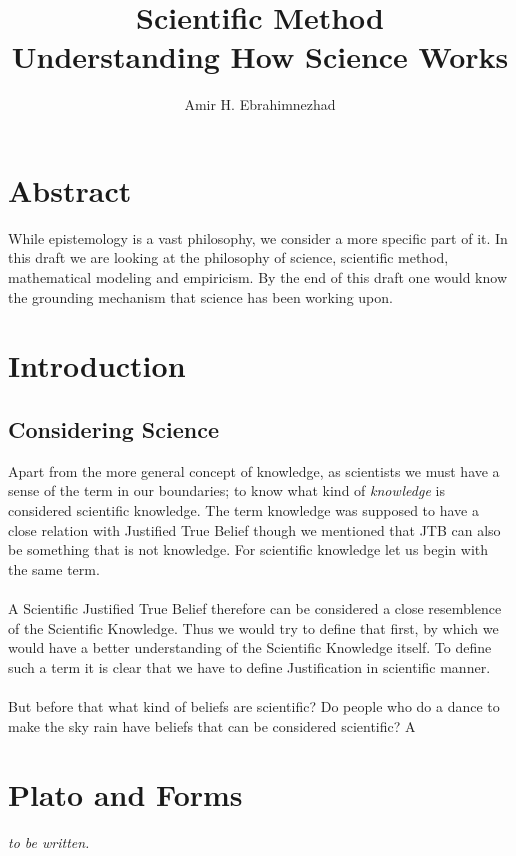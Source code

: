 \documentclass[9pt,a4paper,twocolumn]{article}
\title{Scientific Method \\ \large Understanding How Science Works}
\author{Amir H. Ebrahimnezhad}
\date{}
\newcounter{def}
\begin{document}
        \maketitle
        \tableofcontents
        \section*{Abstract}
            While epistemology is a vast philosophy, we consider a more specific part of it. In this draft we are looking at the philosophy of science, scientific method, mathematical modeling and empiricism. By the end of this draft one would know the grounding mechanism that science has been working upon.
        \section{Introduction}
            \subsection{Considering Science}
                Apart from the more general concept of knowledge, as scientists we must have a sense of the term in our boundaries; to know what kind of \textit{knowledge} is considered scientific knowledge. The term knowledge was supposed to have a close relation with Justified True Belief though we mentioned that JTB can also be something that is not knowledge. For scientific knowledge let us begin with the same term.
                \\
                \\
                A Scientific Justified True Belief therefore can be considered a close resemblence of the Scientific Knowledge. Thus we would try to define that first, by which we would have a better understanding of the Scientific Knowledge itself. To define such a term it is clear that we have to define Justification in scientific manner.
                \\
                \\
                But before that what kind of beliefs are scientific? Do people who do a dance to make the sky rain have beliefs that can be considered scientific? A 
        \section{Plato and Forms}
        \textit{to be written.}
\end{document}
